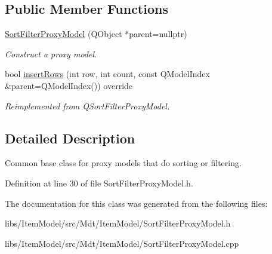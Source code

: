 \subsection*{Public Member Functions}
\begin{DoxyCompactItemize}
\item 
\hyperlink{class_mdt_1_1_item_model_1_1_sort_filter_proxy_model_a316694786f53833c20c46750391db383}{Sort\+Filter\+Proxy\+Model} (Q\+Object $\ast$parent=nullptr)\hypertarget{class_mdt_1_1_item_model_1_1_sort_filter_proxy_model_a316694786f53833c20c46750391db383}{}\label{class_mdt_1_1_item_model_1_1_sort_filter_proxy_model_a316694786f53833c20c46750391db383}

\begin{DoxyCompactList}\small\item\em Construct a proxy model. \end{DoxyCompactList}\item 
bool \hyperlink{class_mdt_1_1_item_model_1_1_sort_filter_proxy_model_a2d9d05cbe33512327a492b3664e2aded}{insert\+Rows} (int row, int count, const Q\+Model\+Index \&parent=Q\+Model\+Index()) override\hypertarget{class_mdt_1_1_item_model_1_1_sort_filter_proxy_model_a2d9d05cbe33512327a492b3664e2aded}{}\label{class_mdt_1_1_item_model_1_1_sort_filter_proxy_model_a2d9d05cbe33512327a492b3664e2aded}

\begin{DoxyCompactList}\small\item\em Reimplemented from Q\+Sort\+Filter\+Proxy\+Model. \end{DoxyCompactList}\end{DoxyCompactItemize}


\subsection{Detailed Description}
Common base class for proxy models that do sorting or filtering. 

Definition at line 30 of file Sort\+Filter\+Proxy\+Model.\+h.



The documentation for this class was generated from the following files\+:\begin{DoxyCompactItemize}
\item 
libs/\+Item\+Model/src/\+Mdt/\+Item\+Model/Sort\+Filter\+Proxy\+Model.\+h\item 
libs/\+Item\+Model/src/\+Mdt/\+Item\+Model/Sort\+Filter\+Proxy\+Model.\+cpp\end{DoxyCompactItemize}
